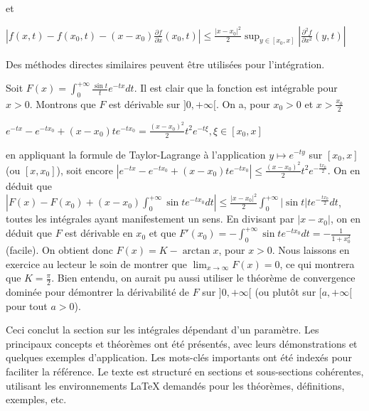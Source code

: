     et
    
    $|f(x,t) - f(x_0,t) - (x - x_0) \frac{\partial f}{\partial x}(x_0,t)| \leq \frac{|x - x_0|^2}{2} \sup_{y \in [x_0,x]} |\frac{\partial^2 f}{\partial x^2}(y,t)|$
    
    Des méthodes directes similaires peuvent être utilisées pour l'intégration.
    
    \begin{example}
    Soit $F(x) = \int_0^{+\infty} \frac{\sin t}{t} e^{-tx} dt$. Il est clair que la fonction est intégrable pour $x > 0$. Montrons que $F$ est dérivable sur $]0,+\infty[$. On a, pour $x_0 > 0$ et $x > \frac{x_0}{2}$
    
    $e^{-tx} - e^{-tx_0} + (x - x_0) t e^{-tx_0} = \frac{(x - x_0)^2}{2} t^2 e^{-t\xi}, \xi \in [x_0,x]$
    
    en appliquant la formule de Taylor-Lagrange à l'application $y \mapsto e^{-ty}$ sur $[x_0,x]$ (ou $[x,x_0]$), soit encore $|e^{-tx} - e^{-tx_0} + (x - x_0) t e^{-tx_0}| \leq \frac{(x-x_0)^2}{2} t^2 e^{-\frac{tx_0}{2}}$. On en déduit que $|F(x) - F(x_0) + (x - x_0) \int_0^{+\infty} \sin t e^{-tx_0} dt| \leq \frac{|x-x_0|^2}{2} \int_0^{+\infty} |\sin t| t e^{-\frac{tx_0}{2}} dt$, toutes les intégrales ayant manifestement un sens. En divisant par $|x - x_0|$, on en déduit que $F$ est dérivable en $x_0$ et que $F'(x_0) = - \int_0^{+\infty} \sin t e^{-tx_0} dt = - \frac{1}{1+x_0^2}$ (facile). On obtient donc $F(x) = K - \arctan x$, pour $x > 0$. Nous laissons en exercice au lecteur le soin de montrer que $\lim_{x \to \infty} F(x) = 0$, ce qui montrera que $K = \frac{\pi}{2}$. Bien entendu, on aurait pu aussi utiliser le théorème de convergence dominée pour démontrer la dérivabilité de $F$ sur $]0,+\infty[$ (ou plutôt sur $[a,+\infty[$ pour tout $a > 0$).
  \end{example}
  
  Ceci conclut la section sur les intégrales dépendant d'un paramètre. Les principaux concepts et théorèmes ont été présentés, avec leurs démonstrations et quelques exemples d'application. Les mots-clés importants ont été indexés pour faciliter la référence. Le texte est structuré en sections et sous-sections cohérentes, utilisant les environnements LaTeX demandés pour les théorèmes, définitions, exemples, etc.